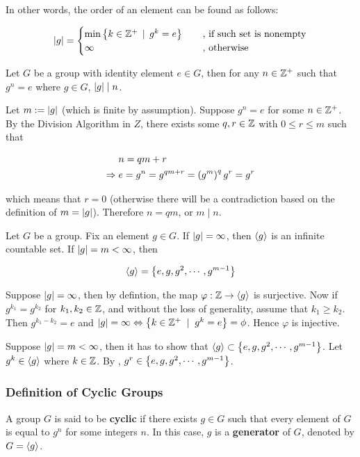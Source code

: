 \documentclass[a4paper,12pt]{article}
\begin{document}
In other words, the order of an element can be found as follows:

$$\left| g\right|=\begin{cases}
  \min\left\{ k\in\mathbb{Z}^{+}\,\mid\, g^{k}=e\right\}&\;\;\;\;\text{, if such set is nonempty}\\
  \infty &\;\;\;\;\text{, otherwise}
\end{cases}$$\s

\begin{pst}
  Let $G$ be a group with identity element $e\in G$, then for any $n\in\mathbb{Z}^{+}$ such that $g^{n}=e$ where $g\in G$, $\left| g\right|\mid n$.\n

  \prf Let $m:=\left| g\right|$ (which is finite by assumption). Suppose $g^{n}=e$ for some $n\in\mathbb{Z}^{+}$. By the Division Algorithm in $Z$, there exists some $q,r\in\mathbb{Z}$ with $0\leq r\leq m$ such that

  $$\begin{aligned}[t]
    &n=qm+r\\
    \Rightarrow\; &e=g^{n}=g^{qm+r}=\left( g^{m}\right)^{q}g^{r}=g^{r}
  \end{aligned}$$\s

  which means that $r=0$ (otherwise there will be a contradiction based on the definition of $m=\left| g\right|$). Therefore $n=qm$, or $m\mid n$.
\end{pst}\n

\begin{thm}
  Let $G$ be a group. Fix an element $g\in G$. If $\left| g\right|=\infty$, then $\left\langle g\right\rangle$ is an infinite countable set. If $\left| g\right|=m<\infty$, then

  $$\left\langle g\right\rangle=\left\{ e,g,g^{2},\cdots,g^{m-1}\right\}$$\s

  \prf Suppose $\left| g\right|=\infty$, then by defintion, the map $\varphi:\mathbb{Z}\rightarrow\left\langle g\right\rangle$ is surjective. Now if $g^{k_{1}}=g^{k_{2}}$ for $k_{1},k_{2}\in\mathbb{Z}$, and without the loss of generality, assume that $k_{1}\geq k_{2}$. Then $g^{k_{1}-k_{2}}=e$ and $\left| g\right|=\infty\Leftrightarrow\left\{ k\in\mathbb{Z}^{+}\;\mid\; g^{k}=e\right\}=\phi$. Hence $\varphi$ is injective.\n

  Suppose $\left| g\right|=m<\infty$, then it has to show that $\left\langle g\right\rangle\subset\left\{ e,g,g^{2},\cdots,g^{m-1}\right\}$. Let $g^{k}\in\left\langle g\right\rangle$ where $k\in\mathbb{Z}$. By \rpst[\sctr{1}], $g^{r}\in\left\{ e,g,g^{2},\cdots,g^{m-1}\right\}$.
\end{thm}

\subsubsection{Definition of Cyclic Groups}
\begin{dft}
  A group $G$ is said to be \textbf{cyclic} if there exists $g\in G$ such that every element of $G$ is equal to $g^{n}$ for some integers $n$. In this case, $g$ is a \textbf{generator} of $G$, denoted by $G=\left\langle g\right\rangle$.
\end{dft}\n
\end{document}
